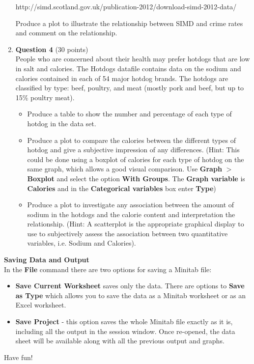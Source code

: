\documentclass[12pt]{article}
\begin{document}
\begin{enumerate}
http://simd.scotland.gov.uk/publication-2012/download-simd-2012-data/

Produce a plot to illustrate the relationship between SIMD and crime rates and comment on the relationship.



\item \textbf{Question 4} (30 points) \\
People who are concerned about their health may prefer hotdogs that are low in salt and calories. The Hotdogs datafile contains data on the sodium and calories contained in each of 54 major hotdog brands. The hotdogs are classified by type: beef, poultry, and meat (mostly pork and beef, but up to 15\% poultry meat).
\begin{itemize}
\item Produce a table to show the number and percentage of each type of hotdog in the data set.
\item Produce a plot to compare the calories between the different types of hotdog and give a subjective impression of any differences. (Hint: This could be done using a boxplot of calories for each type of hotdog on the same graph, which allows a good visual comparison. Use \textbf{Graph} $>$ \textbf{Boxplot} and select the option \textbf{With Groups}. The \textbf{Graph variable} is \textbf{Calories} and in the \textbf{Categorical variables} box enter \textbf{Type})
\item Produce a plot to investigate any association between the amount of sodium in the hotdogs and the calorie content and interpretation the relationship. (Hint: A scatterplot is the appropriate graphical display to use to subjectively assess the association between two quantitative variables, i.e. Sodium and Calories).
\end{itemize}


\end{enumerate}



\textbf{Saving Data and Output}\\


In the \textbf{File} command there are two options for saving a Minitab file:
\begin{itemize}

\item \textbf{Save Current Worksheet} saves only the data. There are options to \textbf{Save as Type} which allows you to save the data as a Minitab worksheet or as an Excel worksheet.
\item \textbf{Save Project} - this option saves the whole Minitab file exactly as it is, including all the output in the session window. Once re-opened, the data sheet will be available along with all the previous output and graphs.

\end{itemize}


Have fun!
\end{document}
